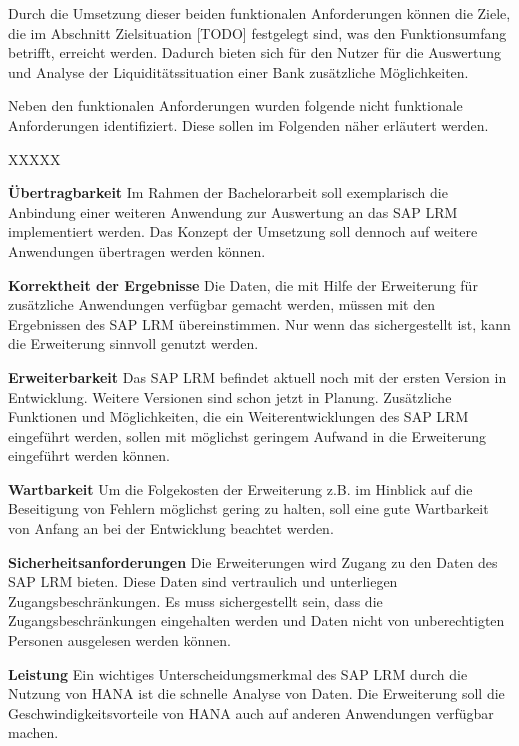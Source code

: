 Durch die Umsetzung dieser beiden funktionalen Anforderungen können die Ziele, die im Abschnitt Zielsituation [TODO] festgelegt sind, was den Funktionsumfang betrifft, erreicht werden. Dadurch bieten sich für den Nutzer für die Auswertung und Analyse der Liquiditätssituation einer Bank zusätzliche Möglichkeiten.

Neben den funktionalen Anforderungen wurden folgende nicht funktionale Anforderungen identifiziert. Diese sollen im Folgenden näher erläutert werden.

\begin{seToplist}{ XXXXX }

\item[\anfl{übertragbarkeit}] \textbf{Übertragbarkeit} \newline
Im Rahmen der Bachelorarbeit soll exemplarisch die Anbindung einer weiteren Anwendung zur Auswertung an das SAP LRM implementiert werden. Das Konzept der Umsetzung soll dennoch auf weitere Anwendungen übertragen werden können.

\item[\anfl{korrektheit}] \textbf{Korrektheit der Ergebnisse} \newline
Die Daten, die mit Hilfe der Erweiterung für zusätzliche Anwendungen verfügbar gemacht werden, müssen mit den Ergebnissen des SAP LRM übereinstimmen. Nur wenn das sichergestellt ist, kann die Erweiterung sinnvoll genutzt werden.

\item[\anfl{erweiterbarkeit}] \textbf{Erweiterbarkeit} \newline
Das SAP LRM befindet aktuell noch mit der ersten Version in Entwicklung. Weitere Versionen sind schon jetzt in Planung. Zusätzliche Funktionen und Möglichkeiten, die ein Weiterentwicklungen des SAP LRM eingeführt werden, sollen mit möglichst geringem Aufwand in die Erweiterung eingeführt werden können.

\item[\anfl{wartbarkeit}] \textbf{Wartbarkeit} \newline
Um die Folgekosten der Erweiterung z.B. im Hinblick auf die Beseitigung von Fehlern möglichst gering zu halten, soll eine gute Wartbarkeit von Anfang an bei der Entwicklung beachtet werden.

\item[\anfl{sicherheit}] \textbf{Sicherheitsanforderungen} \newline
Die Erweiterungen wird Zugang zu den Daten des SAP LRM bieten. Diese Daten sind vertraulich und unterliegen Zugangsbeschränkungen. Es muss sichergestellt sein, dass die Zugangsbeschränkungen eingehalten werden und Daten nicht von unberechtigten Personen ausgelesen werden können.

\item[\anfl{leistung}] \textbf{Leistung} \newline
Ein wichtiges Unterscheidungsmerkmal des SAP LRM durch die Nutzung von \gls{HANA} ist die schnelle Analyse von Daten. Die Erweiterung soll die Geschwindigkeitsvorteile von \gls{HANA} auch auf anderen Anwendungen verfügbar machen.

\end{seToplist}

